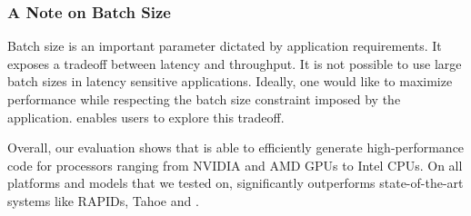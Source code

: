 \subsubsection*{A Note on Batch Size}
Batch size is an important parameter dictated by application requirements. It 
exposes a tradeoff between latency and throughput. It is not possible to use 
large batch sizes in latency sensitive applications. Ideally, one would like 
to maximize performance while respecting the batch size constraint imposed 
by the application. \Treebeard{} enables users to explore this tradeoff.  


Overall, our evaluation shows that \Treebeard{} is able to efficiently generate 
high-performance code for processors ranging from NVIDIA and AMD GPUs to Intel CPUs.
On all platforms and models that we tested on, \Treebeard{} significantly outperforms
state-of-the-art systems like RAPIDs, Tahoe and \TreebeardOLD{}.